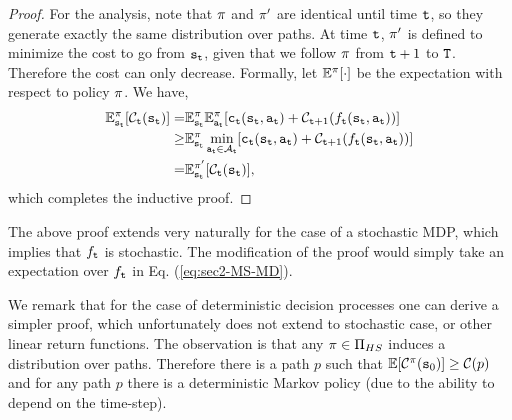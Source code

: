 \begin{proof}
For the analysis, note that $\pi$ and $\pi'$ are identical
until time ${\tt t}$, so they generate exactly the same distribution
over paths. At time ${\tt t}$, $\pi'$ is defined to minimize the
cost to go from ${\tt s}_{\tt t}$, given that we follow $\pi$ from
${\tt t}+1$ to ${\tt T}$. Therefore the cost can only decrease.
Formally, let $\mathbb{E}^\pi[\cdot]$ be the expectation with respect to
policy $\pi$. We have,
\begin{align*}
\mathbb{E}^\pi_{{\tt s}_{\tt t}}[\mathcal{C}_{{\tt t}}({\tt s}_{\tt t})]
= & \mathbb{E}^\pi_{{\tt s}_{\tt t}}
\mathbb{E}^\pi_{{\tt a}_{\tt t}}[{\tt c}_{{\tt t}}({\tt s}_{\tt t},{\tt a}_{\tt t})+\mathcal{C}_{{\tt t}+1}(f_{\tt t}({\tt s}_{\tt t},{\tt a}_{\tt t}))]\\
\geq & \mathbb{E}^\pi_{{\tt s}_{\tt t}} \min_{{\tt a}_{\tt t}\in
\mathcal{A}_{\tt t}}[{\tt c}_{{\tt t}}({\tt s}_{\tt t},{\tt a}_{\tt t})+\mathcal{C}_{{\tt t}+1}(f_{\tt t}({\tt s}_{\tt t},{\tt a}_{\tt t}))]\\
= & \mathbb{E}^{\pi'}_{{\tt s}_{\tt t}} [\mathcal{C}_{\tt t} ({\tt s}_{\tt t})],
\end{align*}
which completes the inductive proof.
%
\end{proof}

\begin{remark}
The above proof extends very naturally for the case of a stochastic
MDP, which implies that $f_{\tt t}$ is stochastic. The modification
of the proof would simply take an expectation over $f_{\tt t}$ in
Eq. (\ref{eq:sec2-MS-MD}).
\end{remark}

\begin{remark}
 We remark that for the case of deterministic decision processes one can derive a simpler proof, which unfortunately does not extend to stochastic case, or other linear return functions. The observation is that any $\pi\in \Pi_{HS}$ induces a distribution over paths. Therefore there is a path $p$ such that $\mathbb{E}[\mathcal{C}^\pi({\tt s}_0)]\geq \mathcal{C}(p)$ and for any path $p$ there is a deterministic Markov policy (due to the ability to depend on the time-step).
 \end{remark}


